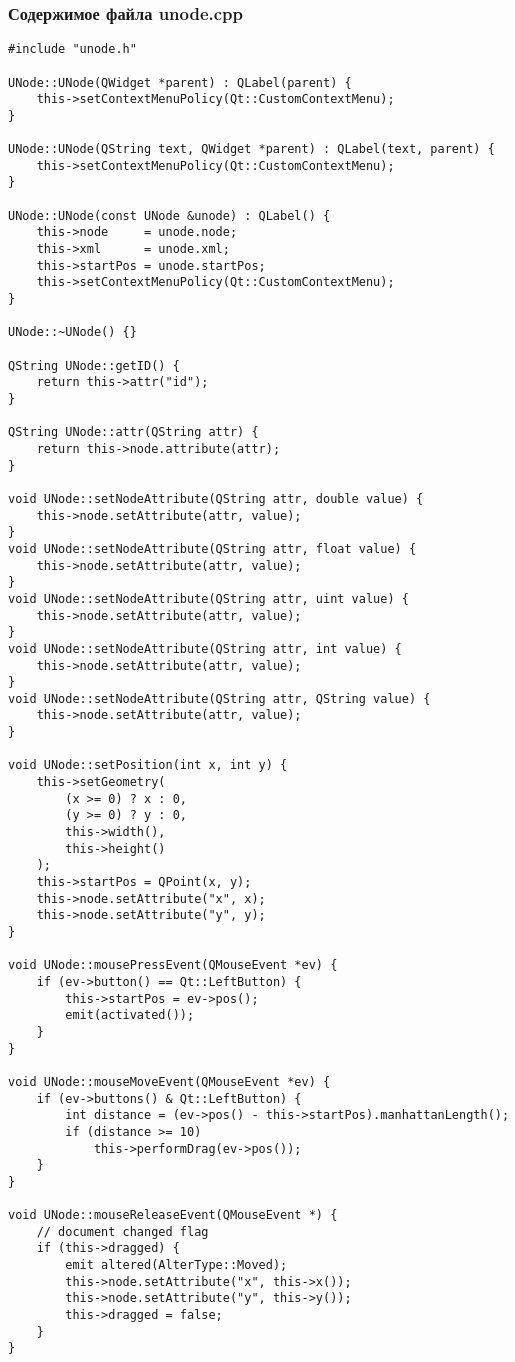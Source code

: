 \subsubsection*{Содержимое файла unode.cpp}

\begin{lstlisting}
#include "unode.h"

UNode::UNode(QWidget *parent) : QLabel(parent) {
    this->setContextMenuPolicy(Qt::CustomContextMenu);
}

UNode::UNode(QString text, QWidget *parent) : QLabel(text, parent) {
    this->setContextMenuPolicy(Qt::CustomContextMenu);
}

UNode::UNode(const UNode &unode) : QLabel() {
    this->node     = unode.node;
    this->xml      = unode.xml;
    this->startPos = unode.startPos;
    this->setContextMenuPolicy(Qt::CustomContextMenu);
}

UNode::~UNode() {}

QString UNode::getID() {
    return this->attr("id");
}

QString UNode::attr(QString attr) {
    return this->node.attribute(attr);
}

void UNode::setNodeAttribute(QString attr, double value) {
    this->node.setAttribute(attr, value);
}
void UNode::setNodeAttribute(QString attr, float value) {
    this->node.setAttribute(attr, value);
}
void UNode::setNodeAttribute(QString attr, uint value) {
    this->node.setAttribute(attr, value);
}
void UNode::setNodeAttribute(QString attr, int value) {
    this->node.setAttribute(attr, value);
}
void UNode::setNodeAttribute(QString attr, QString value) {
    this->node.setAttribute(attr, value);
}

void UNode::setPosition(int x, int y) {
    this->setGeometry(
        (x >= 0) ? x : 0,
        (y >= 0) ? y : 0,
        this->width(),
        this->height()
    );
    this->startPos = QPoint(x, y);
    this->node.setAttribute("x", x);
    this->node.setAttribute("y", y);
}

void UNode::mousePressEvent(QMouseEvent *ev) {
    if (ev->button() == Qt::LeftButton) {
        this->startPos = ev->pos();
        emit(activated());
    }
}

void UNode::mouseMoveEvent(QMouseEvent *ev) {
    if (ev->buttons() & Qt::LeftButton) {
        int distance = (ev->pos() - this->startPos).manhattanLength();
        if (distance >= 10)
            this->performDrag(ev->pos());
    }
}

void UNode::mouseReleaseEvent(QMouseEvent *) {
    // document changed flag
    if (this->dragged) {
        emit altered(AlterType::Moved);
        this->node.setAttribute("x", this->x());
        this->node.setAttribute("y", this->y());
        this->dragged = false;
    }
}


\end{lstlisting}
